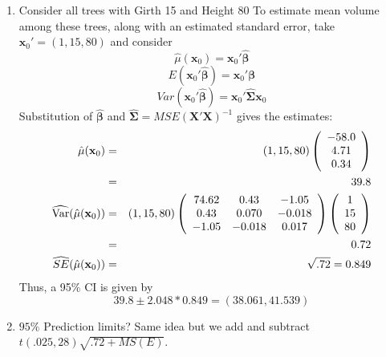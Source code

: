 \documentclass{report}
\begin{document}
\begin{enumerate}
\item Consider all trees with Girth 15 and Height 80 
To estimate mean volume among these trees, along with an estimated
standard error, take $\textbf{x}_0' = (1, 15, 80)$ and consider
$$\hat\mu(\textbf{x}_0) = \textbf{x}_0'\hat{\boldsymbol{\beta}}$$
$$E(\textbf{x}_0'\hat{\boldsymbol{\beta}}) = \textbf{x}_0' \boldsymbol{\beta}$$
$$Var(\textbf{x}_0'\hat{\boldsymbol{\beta}}) =\textbf{x}_0' \hat{\boldsymbol{\Sigma}} \textbf{x}_0$$
Substitution of $\hat{\boldsymbol{\beta}}$ and $\hat{\boldsymbol{\Sigma}}=MSE(\textbf{X}'\textbf{X})^{-1}$ gives the 
estimates:
\begin{eqnarray*}
\hat\mu(\textbf{x}_0) &=& (1, 15, 80) \left(\begin{array}{c}-58.0 \\ 4.71 \\0.34\end{array}\right) \\
& = & 39.8 \\
\widehat{\mbox{Var}}(\hat\mu(\textbf{x}_0)) &=& (1, 15, 80)
\left( \begin{array}{ccc}
74.62      & 0.43      & -1.05 \\
0.43      & 0.070      & -0.018 \\
-1.05      & -0.018    &   0.017 \\
\end{array}\right) 
\left(\begin{array}{c}1 \\ 15 \\80 \end{array}\right) \\
& = & 0.72 \\
\widehat{SE}(\hat\mu(\textbf{x}_0)) &=& \sqrt{.72} = 0.849
\end{eqnarray*}
Thus, a 95\% CI is given by 
$$39.8 \pm 2.048*0.849=(38.061,41.539)$$
\item $95\%$ Prediction limits?  Same idea but we add and subtract $t(.025,28)\sqrt{.72 + MS(E)}$.
\end{enumerate}
\end{document}
